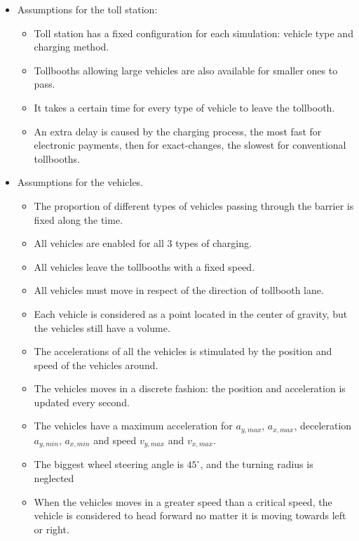 \documentclass{mcmthesis}
\begin{document}
\begin{itemize}
	\item Assumptions for the toll station:
	\begin{itemize}
         \item Toll station has a fixed configuration for each simulation: vehicle type and charging method.
         \item Tollbooths allowing large vehicles are also available for smaller ones to pass.
       	 \item It takes a certain time for every type of vehicle to leave the tollbooth.
	     \item An extra delay is caused by the charging process, the most fast for electronic payments, then for exact-changes, the slowest for conventional tollbooths.
	\end{itemize}

    \item Assumptions for the vehicles.
    \begin{itemize}
    	\item The proportion of different types of vehicles passing through the barrier is fixed along the time.
    	\item All vehicles are enabled for all 3 types of charging.
    	\item All vehicles leave the tollbooths with a fixed speed.
		\item All vehicles must move in respect of the direction of tollbooth lane.
    	\item Each vehicle is considered as a point located in the center of gravity, but the vehicles still have a volume.
    	\item The accelerations of all the vehicles is stimulated by the position and speed of the vehicles around. 
		\item The vehicles moves in a discrete fashion: the position and acceleration is updated every second.
		\item The vehicles have a maximum acceleration for $a_{y,max}$, $a_{x,max}$, deceleration $a_{y,min}$, $a_{x,min}$ and speed $v_{y,max}$ and $v_{x,max}$.
    	\item The biggest wheel steering angle is $45^{\circ}$, and the turning radius is neglected
		\item When the vehicles moves in a greater speed than a critical speed, the vehicle is considered to head forward no matter it is moving towards left or right.
    	
    \end{itemize}


\end{itemize}
\end{document}
